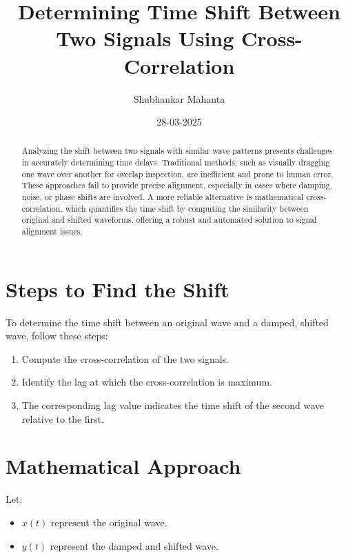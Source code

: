 \documentclass{article}
\title{Determining Time Shift Between Two Signals Using Cross-Correlation}
\author{Shubhankar Mahanta}
\date{28-03-2025}
\begin{document}
	
	\maketitle
	
	
	\begin{abstract}
		Analyzing the shift between two signals with similar wave patterns presents challenges in accurately determining time delays. Traditional methods, such as visually dragging one wave over another for overlap inspection, are inefficient and prone to human error. These approaches fail to provide precise alignment, especially in cases where damping, noise, or phase shifts are involved. A more reliable alternative is mathematical cross-correlation, which quantifies the time shift by computing the similarity between original and shifted waveforms, offering a robust and automated solution to signal alignment issues.
	\end{abstract}
	
	
	\section*{Steps to Find the Shift}
	
	To determine the time shift between an original wave and a damped, shifted wave, follow these steps:
	
	\begin{enumerate}
		\item Compute the cross-correlation of the two signals.
		\item Identify the lag at which the cross-correlation is maximum.
		\item The corresponding lag value indicates the time shift of the second wave relative to the first.
	\end{enumerate}
	
	\section*{Mathematical Approach}
	
	Let:
	\begin{itemize}
		\item \( x(t) \) represent the original wave.
		\item \( y(t) \) represent the damped and shifted wave.
	\end{itemize}
	
\end{document}
